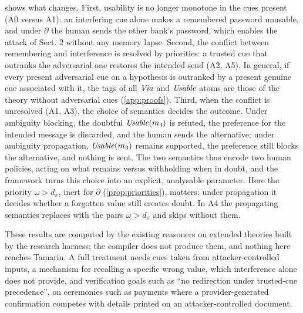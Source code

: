 shows what changes. First, usability is no longer monotone in the cues present (A0 versus A1): an interfering cue alone makes a remembered password unusable, and under $\partial$ the human sends the other bank's password, which enables the attack of Sect. 2 without any memory lapse. Second, the conflict between remembering and interference is resolved by priorities: a trusted cue that outranks the adversarial one restores the intended send (A2, A5). In general, if every present adversarial cue on a hypothesis is outranked by a present genuine cue associated with it, the tags of all $\mathit{Via}$ and $\mathit{Usable}$ atoms are those of the theory without adversarial cues (\cref{app:proofs}). Third, when the conflict is unresolved (A1, A3), the choice of semantics decides the outcome. Under ambiguity blocking, the doubtful $\mathit{Usable}(m_3)$ is refuted, the preference for the intended message is discarded, and the human sends the alternative; under ambiguity propagation, $\mathit{Usable}(m_3)$ remains supported, the preference still blocks the alternative, and nothing is sent. The two semantics thus encode two human policies, acting on what remains versus withholding when in doubt, and the framework turns this choice into an explicit, analysable parameter. Here the priority $\omega>d_\pi$, inert for $\partial$ (\cref{prop:priorities}), matters: under propagation it decides whether a forgotten value still creates doubt. In A4 the propagating semantics replaces with the pairs $\omega>d_\pi$ and skips without them.

These results are computed by the existing reasoners on extended theories built by the research harness; the compiler does not produce them, and nothing here reaches Tamarin. A full treatment needs cues taken from attacker-controlled inputs, a mechanism for recalling a specific wrong value, which interference alone does not provide, and verification goals such as ``no redirection under trusted-cue precedence'', on ceremonies such as payments where a provider-generated confirmation competes with details printed on an attacker-controlled document.